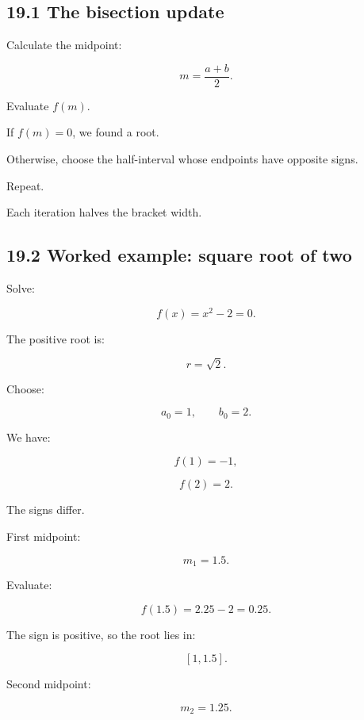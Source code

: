 \subsection{19.1 The bisection update}\label{02-foundations-ii-ch028-the-bisection-update}

\hypertarget{02-foundations-ii-ch028-the-bisection-update}{}

Calculate the midpoint:

\[ \boxed{ m=\frac{a+b}{2} }. \]

Evaluate \(f(m)\).

If \(f(m)=0\), we found a root.

Otherwise, choose the half-interval whose endpoints have opposite signs.

Repeat.

Each iteration halves the bracket width.

\begin{allmightroleexample}

\subsection{19.2 Worked example: square root of two}\label{02-foundations-ii-ch028-worked-example-square-root-of-two}

\hypertarget{02-foundations-ii-ch028-worked-example-square-root-of-two}{}

Solve:

\end{allmightroleexample}

\[ f(x)=x^2-2=0. \]

The positive root is:

\[ r=\sqrt2. \]

Choose:

\[ a_0=1,\qquad b_0=2. \]

We have:

\[ f(1)=-1, \]

\[ f(2)=2. \]

The signs differ.

First midpoint:

\[ m_1=1.5. \]

Evaluate:

\[ f(1.5)=2.25-2=0.25. \]

The sign is positive, so the root lies in:

\[ [1,1.5]. \]

Second midpoint:

\[ m_2=1.25. \]


